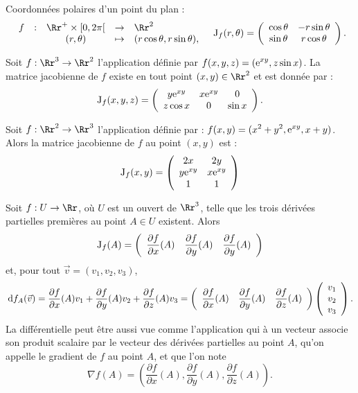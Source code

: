 \documentclass[class=report,crop=false]{standalone}
\begin{document}
\vskip4mm

Coordonnées polaires d'un point du plan :
$$\begin{array}{ccccl}f&:&\Rr^+\times [0,2\pi[&\to &\Rr^2\\ &&(r,\theta)&\mapsto &(r\cos \theta ,r\sin \theta ),\end{array}\quad \ja _f(r,\theta)=\left(\begin{array}{cc}\cos \theta &-r\sin \theta \\\displaystyle \sin \theta &r\cos \theta \end{array}\right).$$

\vskip4mm

Soit $f:\Rr^3\to \Rr^2$ l'application définie par $\displaystyle f(x,y,z)=({\rm e}^{xy},z\sin x)$. La matrice jacobienne de $f$ existe en tout point $(x,y)\in \Rr^2$ et est donnée par :
$$\mathrm{J} _f(x,y,z)=\left(\begin{array}{ccc}y{\rm e}^{xy}&x{\rm e}^{xy}&0 \\\displaystyle z\cos x &0&\sin x \end{array}\right).$$

\vskip4mm

Soit $f:\Rr^2\to \Rr^3$ l'application définie par : $\displaystyle f(x,y)=(x^2+y^2,{\rm e}^{xy},x+y)$. Alors la matrice jacobienne de $f$ au point $(x,y)$ est :
$$\mathrm{J} _f(x,y)=\left(\begin{array}{cc}2x&2y\\y{\rm e}^{xy}&x{\rm e}^{xy}\\ 1&1\end{array}\right)$$

\vskip4mm

Soit $f:U\to \Rr$, o\`u $U$ est un ouvert de $\Rr^3$, telle que les trois dérivées partielles premières au point $A\in U$ existent. Alors
$$\mathrm{J} _f(A)=\left(\begin{array}{ccc}\displaystyle \frac{\partial f}{\partial x}(A)&\displaystyle \frac{\partial f}{\partial y}(A)&\displaystyle \frac{\partial f}{\partial y}(A) \end{array}\right)$$
et, pour tout $\vec{v}=(v_1,v_2,v_3)$,
$$\,\mathrm{d} f_A(\vec{v})=\frac{\partial f}{\partial x}(A)v_1+\frac{\partial f}{\partial y}(A)v_2+\frac{\partial f}{\partial z}(A)v_3=\left(\begin{array}{ccc}\displaystyle \frac{\partial f}{\partial x}(A)&\displaystyle \frac{\partial f}{\partial y}(A)&\displaystyle \frac{\partial f}{\partial z}(A) \end{array}\right)\left(\begin{array}{c}\displaystyle v_1\\ \displaystyle v_2\\ \displaystyle v_3\end{array}\right).$$
La différentielle peut \^etre aussi vue comme l'application qui à un vecteur associe son
produit scalaire par le vecteur des dérivées partielles au point $A$, qu'on appelle le gradient de $f$ au point $A$, et que l'on note
$$\nabla f(A)=\left(\frac{\partial f}{\partial x}(A),\frac{\partial f}{\partial y}(A),\frac{\partial f}{\partial z}(A)\right).$$
\end{document}

